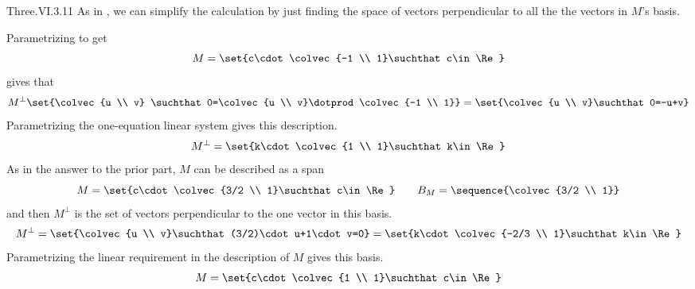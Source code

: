 \begin{ans}{Three.VI.3.11}
       As in , we can simplify the calculation
       by just finding the space of vectors perpendicular to all the the
       vectors in  $M$'s basis.
       \begin{exparts}
         \partsitem Parametrizing to get
           \begin{equation*}
             M=\set{c\cdot\colvec{-1 \\ 1}\suchthat c\in\Re}
           \end{equation*}
           gives that
           \begin{equation*}
             M^\perp
              \set{\colvec{u \\ v}
                   \suchthat
                      0=\colvec{u \\ v}\dotprod\colvec{-1 \\ 1}}
              =\set{\colvec{u \\ v}\suchthat 0=-u+v}
           \end{equation*}
           Parametrizing the one-equation linear system gives this
           description.
           \begin{equation*}
             M^\perp=\set{k\cdot\colvec{1 \\ 1}\suchthat k\in\Re}
           \end{equation*}
         \partsitem As in the answer to the prior part, $M$ can be described as
           a span
           \begin{equation*}
             M=\set{c\cdot\colvec{3/2 \\ 1}\suchthat c\in\Re}
             \qquad
             B_M=\sequence{\colvec{3/2 \\ 1}}
           \end{equation*}
           and then $M^\perp$ is the set of vectors perpendicular to the
           one vector in this basis.
           \begin{equation*}
             M^\perp
             =\set{\colvec{u \\ v}\suchthat (3/2)\cdot u+1\cdot v=0}
             =\set{k\cdot\colvec{-2/3 \\ 1}\suchthat k\in\Re}
           \end{equation*}
         \partsitem Parametrizing the linear requirement in the description
            of $M$ gives this basis.
            \begin{equation*}
              M=\set{c\cdot\colvec{1 \\ 1}\suchthat c\in\Re}

\end{equation*}
\end{exparts}
\end{ans}
